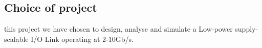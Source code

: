\subsection{Choice of project}

 this project we have chosen to design, analyse and simulate a Low-power supply-scalable I/O Link operating at 2-10Gb/s.